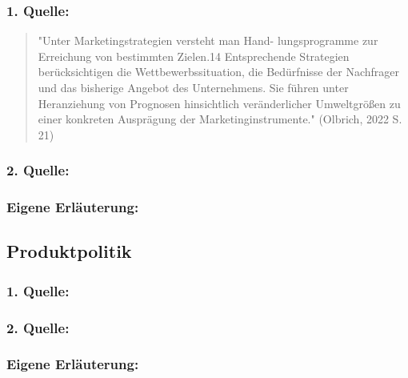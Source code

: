         \subsubsection*{1. Quelle:}
        \begin{abstract}
            \noindent "Unter Marketingstrategien versteht man Hand-
            lungsprogramme zur Erreichung von bestimmten Zielen.14 Entsprechende
            Strategien berücksichtigen die Wettbewerbssituation, die Bedürfnisse der
            Nachfrager und das bisherige Angebot des Unternehmens. Sie führen unter
            Heranziehung von Prognosen hinsichtlich veränderlicher Umweltgrößen zu
            einer konkreten Ausprägung der Marketinginstrumente." (Olbrich, 2022 S. 21)
        \end{abstract}
        \subsubsection*{2. Quelle:}
        \begin{abstract}
        \end{abstract}
        \subsubsection*{Eigene Erläuterung:}
        \begin{abstract}
        \end{abstract}
    \subsection{Produktpolitik}
        \subsubsection*{1. Quelle:}
        \begin{abstract}
            
        \end{abstract}
        \subsubsection*{2. Quelle:}
        \begin{abstract}
        \end{abstract}
        \subsubsection*{Eigene Erläuterung:}
        \begin{abstract}
        \end{abstract}
